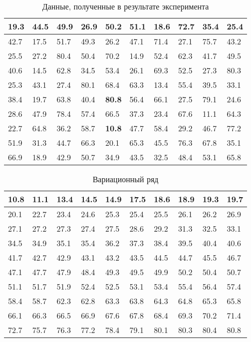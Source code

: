 \documentclass{article}
\theoremstyle{problemstyle}
\begin{document}
\begin{table}[ht]
  \centering
  \begin{tabular}{|l|l|l|l|l|l|l|l|l|l|}
    \hline
    19.3 & 44.5 & 49.9 & 26.9 & 50.2 & 51.1 & 18.6 & 72.7 & 35.4 & 25.4 \\
    \hline
    42.7 & 17.5 & 51.7 & 49.3 & 26.2 & 47.1 & 71.4 & 27.1 & 75.7 & 43.2 \\
    \hline
    25.5 & 27.2 & 80.4 & 50.4 & 70.2 & 14.9 & 52.4 & 62.3 & 41.7 & 49.5 \\ 
    \hline
    40.6 & 14.5 & 62.8 & 34.5 & 53.4 & 26.1 & 69.3 & 52.5 & 27.3 & 80.3 \\
    \hline
    25.3 & 43.1 & 27.4 & 80.1 & 68.4 & 63.3 & 13.4 & 55.4 & 39.5 & 33.1 \\ 
    \hline
    38.4 & 19.7 & 63.8 & 40.4 & \textbf{80.8} & 56.4 & 66.1 & 27.5 & 79.1 & 24.6 \\
    \hline
    28.6 & 47.9 & 78.4 & 57.4 & 66.5 & 37.3 & 23.4 & 67.6 & 11.1 & 64.3 \\
    \hline
    22.7 & 64.8 & 36.2 & 58.7 & \textbf{10.8} & 47.7 & 58.4 & 29.2 & 46.7 & 77.2 \\
    \hline
    51.9 & 31.3 & 44.7 & 66.3 & 20.1 & 65.3 & 45.5 & 76.3 & 67.8 & 35.1 \\
    \hline
    66.9 & 18.9 & 42.9 & 50.7 & 34.9 & 43.5 & 32.5 & 48.4 & 53.1 & 65.8 \\
    \hline
  \end{tabular}
  \caption{Данные, полученные в результате эксперимента}\label{table:data}
\end{table}

\begin{table}[ht]
  \centering
  \begin{tabular}{|l|l|l|l|l|l|l|l|l|l|}
    \hline
    10.8 & 11.1 & 13.4 & 14.5 & 14.9 & 17.5 & 18.6 & 18.9 & 19.3 & 19.7 \\
    \hline
    20.1 & 22.7 & 23.4 & 24.6 & 25.3 & 25.4 & 25.5 & 26.1 & 26.2 & 26.9 \\
    \hline
    27.1 & 27.2 & 27.3 & 27.4 & 27.5 & 28.6 & 29.2 & 31.3 & 32.5 & 33.1 \\
    \hline
    34.5 & 34.9 & 35.1 & 35.4 & 36.2 & 37.3 & 38.4 & 39.5 & 40.4 & 40.6 \\
    \hline
    41.7 & 42.7 & 42.9 & 43.1 & 43.2 & 43.5 & 44.5 & 44.7 & 45.5 & 46.7 \\
    \hline
    47.1 & 47.7 & 47.9 & 48.4 & 49.3 & 49.5 & 49.9 & 50.2 & 50.4 & 50.7 \\
    \hline
    51.1 & 51.7 & 51.9 & 52.4 & 52.5 & 53.1 & 53.4 & 55.4 & 56.4 & 57.4 \\
    \hline
    58.4 & 58.7 & 62.3 & 62.8 & 63.3 & 63.8 & 64.3 & 64.8 & 65.3 & 65.8 \\
    \hline
    66.1 & 66.3 & 66.5 & 66.9 & 67.6 & 67.8 & 68.4 & 69.3 & 70.2 & 71.4 \\
    \hline
    72.7 & 75.7 & 76.3 & 77.2 & 78.4 & 79.1 & 80.1 & 80.3 & 80.4 & 80.8 \\
    \hline
  \end{tabular}
  \caption{Вариационный ряд}\label{table:var_series}
\end{table}
\end{document}
